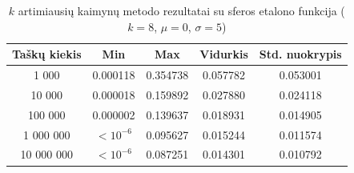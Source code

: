 \begin{table}[H]
    \centering
    \begin{tabular}{|c|c|c|c|c|}
        \hline
        \textbf{Taškų kiekis} & \textbf{Min} & \textbf{Max} & \textbf{Vidurkis} & \textbf{Std. nuokrypis} \\ \hline
        1 000        & 0.000118 & 0.354738 & 0.057782 & 0.053001 \\ \hline
        10 000       & 0.000018 & 0.159892 & 0.027880 & 0.024118 \\ \hline
        100 000      & 0.000002 & 0.139637 & 0.018931 & 0.014905 \\ \hline
        1 000 000    & $<10^{-6}$ & 0.095627 & 0.015244 & 0.011574 \\ \hline
        10 000 000   & $<10^{-6}$ & 0.087251 & 0.014301 & 0.010792 \\ \hline
    \end{tabular}
    \caption{$k$ artimiausių kaimynų metodo rezultatai su sferos etalono funkcija ($k = 8$, $\mu = 0$, $\sigma = 5$)}
\end{table}